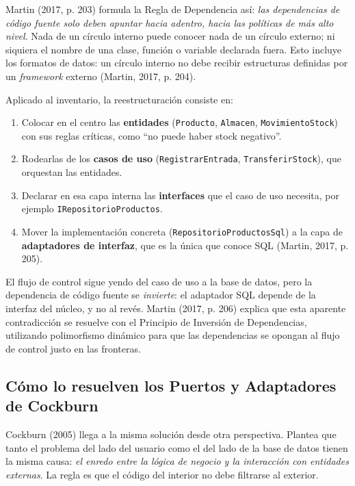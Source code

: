 \documentclass[11pt,a4paper]{article}
\begin{document}
Martin (2017, p. 203) formula la Regla de Dependencia así: \emph{las dependencias de código fuente solo deben apuntar hacia adentro, hacia las políticas de más alto nivel}. Nada de un círculo interno puede conocer nada de un círculo externo; ni siquiera el nombre de una clase, función o variable declarada fuera. Esto incluye los formatos de datos: un círculo interno no debe recibir estructuras definidas por un \emph{framework} externo (Martin, 2017, p. 204).

Aplicado al inventario, la reestructuración consiste en:

\begin{enumerate}[leftmargin=1.5em]
  \item Colocar en el centro las \textbf{entidades} (\texttt{Producto}, \texttt{Almacen}, \texttt{MovimientoStock}) con sus reglas críticas, como ``no puede haber stock negativo''.
  \item Rodearlas de los \textbf{casos de uso} (\texttt{RegistrarEntrada}, \texttt{TransferirStock}), que orquestan las entidades.
  \item Declarar en esa capa interna las \textbf{interfaces} que el caso de uso necesita, por ejemplo \texttt{IRepositorioProductos}.
  \item Mover la implementación concreta (\texttt{RepositorioProductosSql}) a la capa de \textbf{adaptadores de interfaz}, que es la única que conoce SQL (Martin, 2017, p. 205).
\end{enumerate}

El flujo de control sigue yendo del caso de uso a la base de datos, pero la dependencia de código fuente se \emph{invierte}: el adaptador SQL depende de la interfaz del núcleo, y no al revés. Martin (2017, p. 206) explica que esta aparente contradicción se resuelve con el Principio de Inversión de Dependencias, utilizando polimorfismo dinámico para que las dependencias se opongan al flujo de control justo en las fronteras.

\subsection{Cómo lo resuelven los Puertos y Adaptadores de Cockburn}

Cockburn (2005) llega a la misma solución desde otra perspectiva. Plantea que tanto el problema del lado del usuario como el del lado de la base de datos tienen la misma causa: \emph{el enredo entre la lógica de negocio y la interacción con entidades externas}. La regla es que el código del interior no debe filtrarse al exterior.
\end{document}
